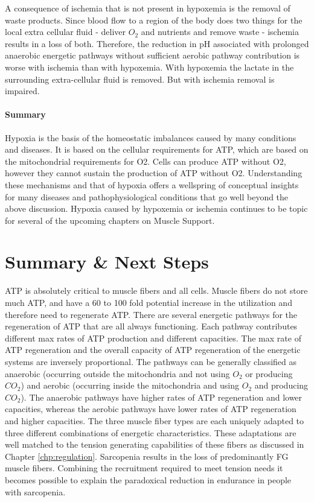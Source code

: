 A consequence of ischemia that is not present in hypoxemia is the removal of waste products. Since blood flow to a region of the body does two things for the local extra cellular fluid - deliver $O_2$ and nutrients and remove waste - ischemia results in a loss of both. Therefore, the reduction in pH associated with prolonged anaerobic energetic pathways without sufficient aerobic pathway contribution is worse with ischemia than with hypoxemia. With hypoxemia the lactate in the surrounding extra-cellular fluid is removed. But with ischemia removal is impaired. 

\paragraph{Summary}
Hypoxia is the basis of the homeostatic imbalances caused by many conditions and diseases. It is based on the cellular requirements for ATP, which are based on the mitochondrial requirements for O2. Cells can produce ATP without O2, however they cannot sustain the production of ATP without O2. Understanding these mechanisms and that of hypoxia offers a wellspring of conceptual insights for many diseases and pathophysiological conditions that go well beyond the above discussion. Hypoxia caused by hypoxemia or ischemia continues to be topic for several of the upcoming chapters on Muscle Support.



\section{Summary \& Next Steps}

ATP is absolutely critical to muscle fibers and all cells. Muscle fibers do not store much ATP, and have a 60 to 100 fold potential increase in the utilization and therefore need to regenerate ATP. There are several energetic pathways for the regeneration of ATP that are all always functioning.  Each pathway contributes different max rates of ATP production and different capacities. The max rate of ATP regeneration and the overall capacity of ATP regeneration of the energetic systems are inversely proportional. The pathways can be generally classified as anaerobic (occurring outside the mitochondria and not using $O_2$ or producing $CO_2$) and aerobic (occurring inside the mitochondria and using $O_2$ and producing $CO_2$). The anaerobic pathways have higher rates of ATP regeneration and lower capacities, whereas the aerobic pathways have lower rates of ATP regeneration and higher capacities. The three muscle fiber types are each uniquely adapted to three different combinations of energetic characteristics. These adaptations are well matched to the tension generating capabilities of these fibers as discussed in Chapter \ref{chp:regulation}. 
Sarcopenia results in the loss of predominantly FG muscle fibers. Combining the recruitment required to meet tension needs it becomes possible to explain the paradoxical reduction in endurance in people with sarcopenia. 





\printbibliography[heading=subbibintoc]